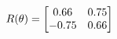 \documentclass[preview]{standalone}
\begin{document}
\begin{align*}
\special{dvisvgm:raw <g id='unique000'>}R(\theta) = \begin{bmatrix}0.66 & 0.75\\-0.75 & 0.66\end{bmatrix}\special{dvisvgm:raw </g>}
\end{align*}
\end{document}
